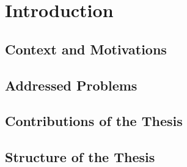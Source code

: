 \chapter{Introduction}

\section{Context and Motivations}

\section{Addressed Problems}

\section{Contributions of the Thesis}

\section{Structure of the Thesis}